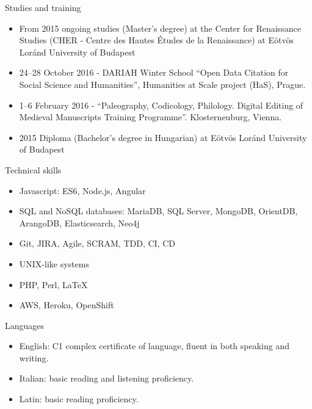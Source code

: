 Studies and training

\begin{itemize}
  \item{From 2015 ongoing studies (Master's degree) at the Center for Renaissance Studies 
    (CHER - Centre des Hautes Études de la Renaissance) at Eötvös Loránd University of Budapest}
  \item{24–28 October 2016 - DARIAH Winter School ``Open Data Citation for Social Science and Humanities'', 
    Humanities at Scale project (HaS), Prague. }
  \item{1--6 February 2016 - ``Paleography, Codicology, Philology.
    Digital Editing of Medieval Manuscripts Training Programme''.
    Klosterneuburg, Vienna. }
  \item{2015 Diploma (Bachelor's degree in Hungarian) at Eötvös Loránd University of Budapest}
\end{itemize}


Technical skills

  \begin{itemize}
    \item{Javascript: ES6, Node.js, Angular}
    \item{SQL and NoSQL databases: MariaDB, SQL Server, 
      MongoDB, OrientDB, ArangoDB, Elasticsearch, Neo4j}
    \item{Git, JIRA, Agile, SCRAM, TDD, CI, CD}
    \item{UNIX-like systems}
    \item{PHP, Perl, \LaTeX}
    \thispagestyle{fancy}
    \item{AWS, Heroku, OpenShift}
  \end{itemize}

Languages
  
  \begin{itemize}
    \item{English: C1 complex certificate of language, fluent in both speaking and writing.}
    \item{Italian: basic reading and listening proficiency.}
    \item{Latin: basic reading proficiency.}
  \end{itemize}

\thispagestyle{fancy}

